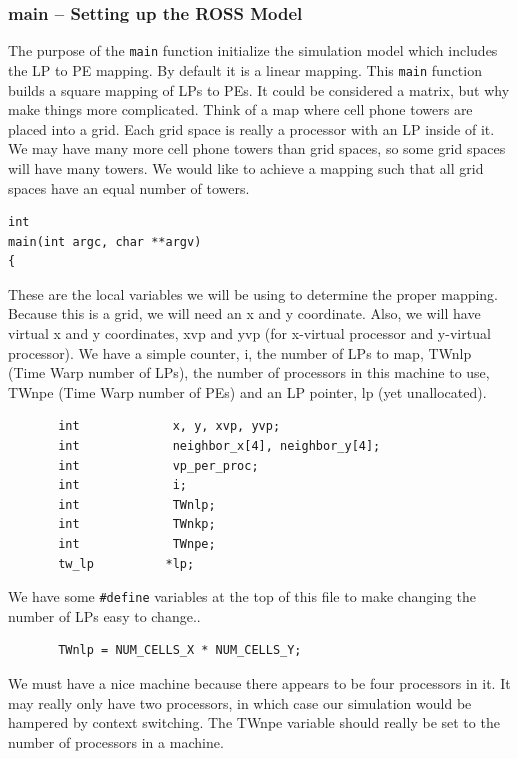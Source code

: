 \documentclass[12pt]{article}
\begin{document}
\subsubsection{main -- Setting up the ROSS Model}
The purpose of the {\tt main} function initialize the simulation model which
includes the LP to PE mapping. By default it is a linear mapping.  This 
{\tt main}
function builds a square mapping of LPs to PEs.  It could be considered a
matrix, but why make things more complicated.  Think of a map where cell phone
towers are placed into a grid.  Each grid space is really a processor with an
LP inside of it.  We may have many more cell phone towers than grid spaces, so
some grid spaces will have many towers.  We would like to achieve a mapping
such that all grid spaces have an equal number of towers.

\begin{verbatim}
int
main(int argc, char **argv)
{
\end{verbatim}

These are the local variables we will be using to determine the proper
mapping.  Because this is a grid, we will need an x and y coordinate.  Also,
we will have virtual x and y coordinates, xvp and yvp (for x-virtual processor
and y-virtual processor).  We have a simple counter, i, the number of LPs to
map, TWnlp (Time Warp number of LPs), the number of processors in this machine
to use, TWnpe (Time Warp number of PEs) and an LP pointer, lp (yet
unallocated).
 
\begin{verbatim}
       int             x, y, xvp, yvp;
       int             neighbor_x[4], neighbor_y[4];
       int             vp_per_proc;
       int             i;
       int             TWnlp;
       int             TWnkp;
       int             TWnpe;
       tw_lp          *lp;
\end{verbatim}
 
We have some {\tt \#define} variables at the top of this file to make
changing the number of LPs easy to change..

\begin{verbatim}      
       TWnlp = NUM_CELLS_X * NUM_CELLS_Y;
\end{verbatim}
 

We must have a nice machine because there appears to be four
processors in it.  It may really only have two processors, in which
case our simulation would be hampered by context switching.  The TWnpe
variable should really be set to the number of processors in a
machine.
\end{document}
